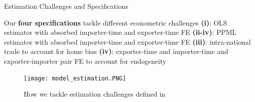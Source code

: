 \documentclass[10pt]{beamer}
\begin{document}
\begin{frame}{Estimation Challenges and Specifications}
\begin{alertblock}{\color{mChallengeRed}{Estimation Challenges}}
    \begin{outline}
    \1 Our \textbf{four specifications} tackle different econometric challenges
    \2 \textbf{(i)}: OLS estimator with absorbed importer-time and exporter-time FE
    \2 \textbf{(ii-iv)}: PPML estimator with absorbed importer-time and exporter-time FE
    \3 \textbf{(iii)}: intra-national trade to account for home bias
    \3 \textbf{(iv)}: exporter-time and importer-time and exporter-importer pair FE to account for endogeneity
    \end{outline}
\end{alertblock}

\begin{alertblock}{\color{mLightGreen}{Solutions}}
    \begin{figure}
    \texttt{[image: model\_estimation.PNG]} %
    \tiny{\caption{How we tackle estimation challenges defined in \cite{yotov2016advanced}}}
   \end{figure}
\end{alertblock}

\end{frame}
\end{document}
